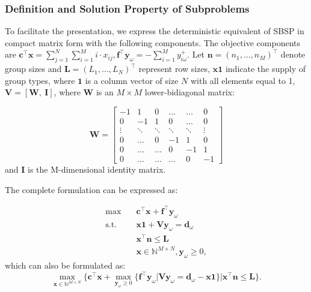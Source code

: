 \subsubsection{Definition and Solution Property of Subproblems}
To facilitate the presentation, we express the deterministic equivalent of SBSP in compact matrix form with the following components. The objective components are $\mathbf{c}^{\intercal}\mathbf{x} = \sum_{j =1}^{N} \sum_{i=1}^M i \cdot x_{ij}, \mathbf{f}^{\intercal}\mathbf{y}_{\omega} = -\sum_{i=1}^{M} y_{i \omega}^{+}$. Let $\mathbf{n} = (n_1, \ldots, n_M)^{\intercal}$ denote group sizes and $\mathbf{L} = (L_1, \ldots, L_N)^{\intercal}$ represent row sizes, $\mathbf{x} \mathbf{1}$ indicate the supply of group types, where $\mathbf{1}$ is a column vector of size $N$ with all elements equal to 1, $\mathbf{V} = [\mathbf{W}, ~\mathbf{I}]$, where $\mathbf{W}$ is an $M \times M$ lower-bidiagonal matrix:

$$
\mathbf{W}=\left[\begin{array}{cccccc}
-1 & 1 & 0 & \ldots & \ldots & 0 \\
0 & -1 & 1 &    0   & \ldots & 0 \\
\vdots & \ddots & \ddots & \ddots & \ddots & \vdots \\
0  & \ldots   &  0  & -1 & 1 & 0 \\
0  & \ldots   &  \ldots  &  0 &  -1 & 1 \\
0 & \ldots & \ldots & \ldots & 0 & -1
\end{array}\right]
$$
and $\mathbf{I}$ is the M-dimensional identity matrix.

The complete formulation can be expressed as:

\begin{equation}\label{BD_master}
  \begin{aligned}
  \max \quad & \mathbf{c}^{\intercal} \mathbf{x}+ \mathbf{f}^{\intercal} \mathbf{y}_{\omega} \\
  \text {s.t.} \quad & \mathbf{x} \mathbf{1} + \mathbf{V} \mathbf{y}_{\omega} = \mathbf{d}_{\omega} \\
  & \mathbf{x}^{\intercal} \mathbf{n} \leq \mathbf{L} \\
  & \mathbf{x} \in \mathbb{N}^{M \times N}, \mathbf{y}_{\omega} \geq 0,
  \end{aligned}
\end{equation}
which can also be formulated as:
\begin{equation}\label{BD_master1}
  \max_{\mathbf{x} \in \mathbb{N}^{M \times N}} \{ \mathbf{c}^{\intercal} \mathbf{x} + \max_{\mathbf{y}_{\omega} \geq 0} \{\mathbf{f}^{\intercal} \mathbf{y}_{\omega} \big| \mathbf{V} \mathbf{y}_{\omega} = \mathbf{d}_{\omega} -\mathbf{x} \mathbf{1}\} \Big| 
   \mathbf{x}^{\intercal} \mathbf{n} \leq \mathbf{L} \}.
\end{equation}

